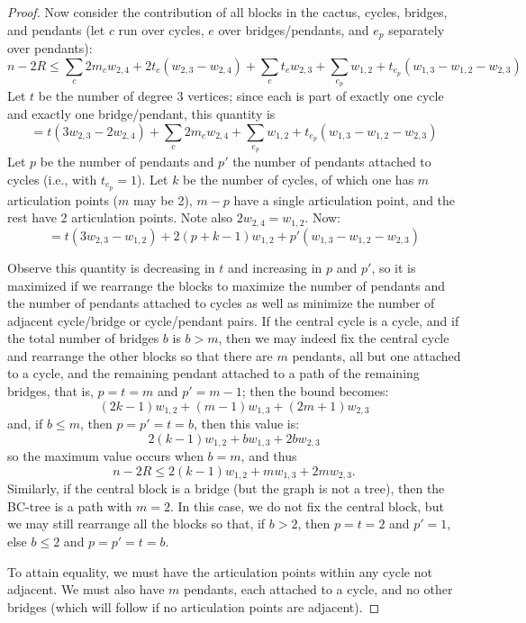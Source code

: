 \documentclass{amsart}
\theoremstyle{definition}
\begin{document}
\begin{proof}
Now consider the contribution of all blocks in the cactus, cycles, bridges, and pendants (let $c$ run over cycles, $e$ over bridges/pendants, and $e_p$ separately over pendants):
\[n-2R \leq \sum_c 2m_cw_{2,4} + 2t_c(w_{2,3}-w_{2,4}) + \sum_e t_ew_{2,3} + \sum_{e_p} w_{1,2} + t_{e_p}(w_{1,3}-w_{1,2}-w_{2,3})\]
Let $t$ be the number of degree 3 vertices; since each is part of exactly one cycle and exactly one bridge/pendant, this quantity is
\[= t(3w_{2,3}-2w_{2,4}) + \sum_c 2m_cw_{2,4} + \sum_{e_p} w_{1,2} + t_{e_p}(w_{1,3}-w_{1,2}-w_{2,3})\]
Let $p$ be the number of pendants and $p'$ the number of pendants attached to cycles (i.e., with $t_{e_p} = 1$). Let $k$ be the number of cycles, of which one has $m$ articulation points ($m$ may be 2), $m-p$ have a single articulation point, and the rest have 2 articulation points. Note also $2w_{2,4} =w_{1,2}$. Now:
\[= t(3w_{2,3}-w_{1,2}) + 2(p+k-1)w_{1,2} + p'(w_{1,3}-w_{1,2}-w_{2,3})\]

Observe this quantity is decreasing in $t$ and increasing in $p$ and $p'$, so it is maximized if we rearrange the blocks to maximize the number of pendants and the number of pendants attached to cycles as well as minimize the number of adjacent cycle/bridge or cycle/pendant pairs. If the central cycle is a cycle, and if the total number of bridges $b$ is $b > m$, then we may indeed fix the central cycle and rearrange the other blocks so that there are $m$ pendants, all but one attached to a cycle, and the remaining pendant attached to a path of the remaining bridges, that is, $p=t=m$ and $p'=m-1$; then the bound becomes:
\[(2k-1)w_{1,2} + (m-1)w_{1,3} + (2m+1)w_{2,3} \]
and, if $b \leq m$, then $p=p'=t=b$, then this value is:
\[2(k-1)w_{1,2} + bw_{1,3} + 2bw_{2,3} \]
so the maximum value occurs when $b=m$, and thus
\[n-2R \leq 2(k-1)w_{1,2} + mw_{1,3} + 2mw_{2,3}.\]
Similarly, if the central block is a bridge (but the graph is not a tree), then the BC-tree is a path with $m=2$. In this case, we do not fix the central block, but we may still rearrange all the blocks so that, if $b > 2$, then $p=t=2$ and $p'=1$, else $b \leq 2$ and $p=p'=t=b$.

To attain equality, we must have the articulation points within any cycle not adjacent. We must also have $m$ pendants, each attached to a cycle, and no other bridges (which will follow if no articulation points are adjacent). 
\end{proof}
\end{document}

